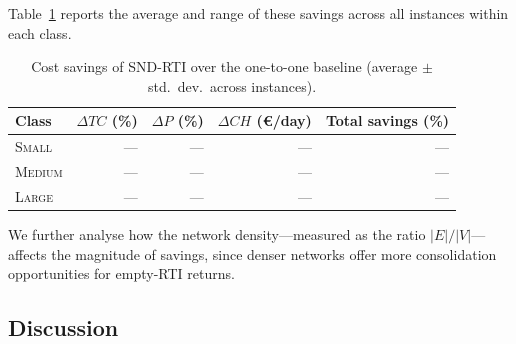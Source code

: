 Table~\ref{tab:baseline} reports the average and range of these
savings across all instances within each class.

\begin{table}[ht]
\centering
\caption{Cost savings of SND-RTI over the one-to-one baseline
  (average $\pm$ std.\ dev.\ across instances).}
\label{tab:baseline}
\small
\begin{tabular}{lrrrr}
\toprule
\textbf{Class}
  & $\Delta TC$ (\%)
  & $\Delta P$ (\%)
  & $\Delta CH$ (\euro/day)
  & \textbf{Total savings (\%)} \\
\midrule
\textsc{Small}  & --- & --- & --- & --- \\
\textsc{Medium} & --- & --- & --- & --- \\
\textsc{Large}  & --- & --- & --- & --- \\
\bottomrule
\end{tabular}
\end{table}

We further analyse how the network density---measured as the ratio
$|E|/|V|$---affects the magnitude of savings, since denser networks
offer more consolidation opportunities for empty-RTI returns.


\subsection{Discussion}
\label{sec:exp-discussion}

